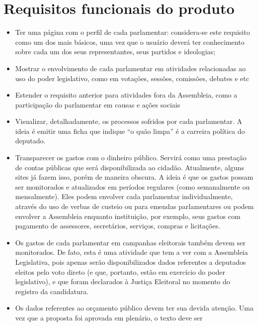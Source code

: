 \documentclass[12pt, a4paper]{article}
\begin{document}
    \section{Requisitos funcionais do produto}
    \begin{itemize}
        \item
        Ter uma página com o perfil de cada parlamentar: considera-se este
        requisito como um dos mais básicos, uma vez que o usuário deverá ter
        conhecimento sobre cada um dos seus representantes, seus partidos e
        ideologias;
        \item
        Mostrar o envolvimento de cada parlamentar em atividades relacionadas
        ao uso do poder legislativo, como em votações, sessões, comissões,
        debates e etc
        \item
        Estender o requisito anterior para atividades fora da Assembleia, como
        a participação do parlamentar em causas e ações sociais
        \item
        Visualizar, detalhadamente, os processos sofridos por cada parlamentar.
        A ideia é emitir uma ficha que indique “o quão limpa” é a carreira
        política do deputado.
        \item
        Transparecer os gastos com o dinheiro público. Servirá como uma
        prestação de contas públicas que será disponibilizada ao cidadão.
        Atualmente, alguns sites já fazem isso, porém de maneira obscura. A
        ideia é que os gastos possam ser monitorados e atualizados em períodos
        regulares (como semanalmente ou mensalmente). Eles podem envolver cada
        parlamentar individualmente, através do uso de verbas de custeio ou
        para emendas parlamentares ou podem envolver a Assembleia enquanto
        instituição, por exemplo, seus gastos com pagamento de assessores,
        secretários, serviços, compras e licitações.
        \item
        Os gastos de cada parlamentar em campanhas eleitorais também devem ser
        monitorados. De fato, esta é uma atividade que tem a ver com a
        Assembleia Legislativa, pois apenas serão disponibilizados dados
        referentes a deputados eleitos pelo voto direto (e que, portanto, estão
        em exercício do poder legislativo), e que foram declarados à Justiça
        Eleitoral no momento do registro da candidatura.
        \item
        Os dados referentes ao orçamento público devem ter sua devida atenção.
        Uma vez que a proposta foi aprovada em plenário, o texto deve ser

\end{itemize}
\end{document}
